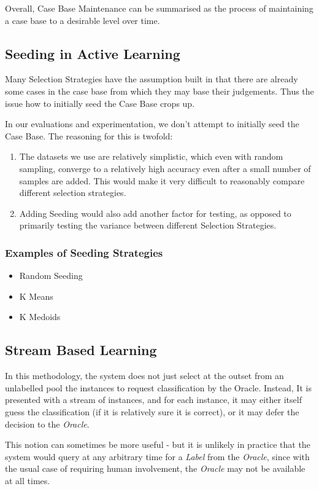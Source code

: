\documentclass[a4paper,11pt]{report}
\begin{document}
Overall, Case Base Maintenance can be summarised as the process of maintaining a case base to a desirable level over time.

\subsection{Seeding in Active Learning}
Many Selection Strategies have the assumption built in that there are already some cases in the case base from which they may base their judgements. Thus the issue how to initially seed the Case Base crops up.

In our evaluations and experimentation, we don't attempt to initially seed the Case Base. The reasoning for this is twofold: 
\begin{enumerate}
	\item The datasets we use are relatively simplistic, which even with random sampling, converge to a relatively high accuracy even after a small number of samples are added. This would make it very difficult to reasonably compare different selection strategies. 
	\item Adding Seeding would also add another factor for testing, as opposed to primarily testing the variance between different Selection Strategies.
\end{enumerate}

\subsubsection{Examples of Seeding Strategies}
\begin{itemize}
	\item Random Seeding
	\item K Means
	\item K Medoids
\end{itemize}

\subsection{Stream Based Learning}
In this methodology, the system does not just select at the outset from an unlabelled pool the instances to request classification by the Oracle. Instead, It is presented with a stream of instances, and for each instance, it may either itself guess the classification (if it is relatively sure it is correct), or it may defer the decision to the \emph{Oracle}.

This notion can sometimes be more useful - but it is unlikely in practice that the system would query at any arbitrary time for a \emph{Label} from the \emph{Oracle}, since with the usual case of requiring human involvement, the \emph{Oracle} may not be available at all times.
\end{document}
